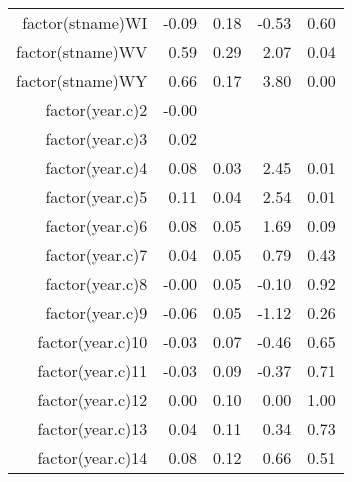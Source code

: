 \begin{table}[ht]
\begin{tabular}{rrrrr}
  factor(stname)WI & -0.09 & 0.18 & -0.53 & 0.60 \\ 
  factor(stname)WV & 0.59 & 0.29 & 2.07 & 0.04 \\ 
  factor(stname)WY & 0.66 & 0.17 & 3.80 & 0.00 \\ 
  factor(year.c)2 & -0.00 &  &  &  \\ 
  factor(year.c)3 & 0.02 &  &  &  \\ 
  factor(year.c)4 & 0.08 & 0.03 & 2.45 & 0.01 \\ 
  factor(year.c)5 & 0.11 & 0.04 & 2.54 & 0.01 \\ 
  factor(year.c)6 & 0.08 & 0.05 & 1.69 & 0.09 \\ 
  factor(year.c)7 & 0.04 & 0.05 & 0.79 & 0.43 \\ 
  factor(year.c)8 & -0.00 & 0.05 & -0.10 & 0.92 \\ 
  factor(year.c)9 & -0.06 & 0.05 & -1.12 & 0.26 \\ 
  factor(year.c)10 & -0.03 & 0.07 & -0.46 & 0.65 \\ 
  factor(year.c)11 & -0.03 & 0.09 & -0.37 & 0.71 \\ 
  factor(year.c)12 & 0.00 & 0.10 & 0.00 & 1.00 \\ 
  factor(year.c)13 & 0.04 & 0.11 & 0.34 & 0.73 \\ 
  factor(year.c)14 & 0.08 & 0.12 & 0.66 & 0.51 \\ 
   \hline
\end{tabular}
\end{table}
